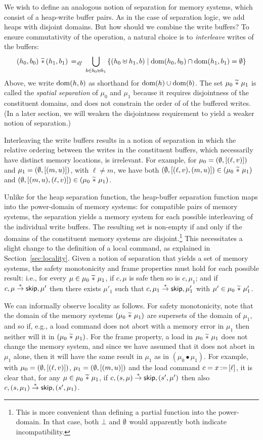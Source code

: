 \documentclass[11pt]{report}
\begin{document}
We wish to define an analogous notion of separation for memory systems, which consist of a heap-write buffer pairs. As in the case of separation logic, we add heaps with disjoint domains. But how should we combine the write buffers? To ensure commutativity of the operation, a natural choice is to \emph{interleave} writes of the buffers: \[ (h_0,b_0) \operatorname{\,\widetilde{\ast}\,} (h_1,b_1) \operatorname{\;=_{\mathit{df}}\;} \bigcup_{b \in b_0 \uplus b_1}
    \left\lbrace (h_0 \uplus h_1, b) \mid \operatorname{\mathrm{dom}}(h_0,b_0) \cap \operatorname{\mathrm{dom}}(h_1,b_1) = \operatorname{\emptyset} \right\rbrace
\] Above, we write $\operatorname{\mathrm{dom}}(h,b)$ as shorthand for $\operatorname{\mathrm{dom}}(h) \cup \operatorname{\mathrm{dom}}(b)$. The set $\mu_0 \operatorname{\,\widetilde{\ast}\,} \mu_1$ is called the \emph{spatial separation} of $\mu_0$ and $\mu_1$ because it requires disjointness of the constituent domains, and does not constrain the order of of the buffered writes. (In a later section, we will weaken the disjointness requirement to yield a weaker notion of separation.)

Interleaving the write buffers results in a notion of separation in which the relative ordering between the writes in the constituent buffers, which necessarily have distinct memory locations, is irrelevant. For example, for $\mu_0 = (\operatorname{\emptyset},\left[(\ell,v)\right])$ and $\mu_1 = (\operatorname{\emptyset},\left[(m,u)\right])$, with $\ell \neq m$, we have both $(\operatorname{\emptyset},\left[(\ell,v),(m,u)\right]) \in (\mu_0 \operatorname{\,\widetilde{\ast}\,} \mu_1)$ and $(\operatorname{\emptyset},\left[(m,u),(\ell,v)\right]) \in (\mu_0 \operatorname{\,\widetilde{\ast}\,} \mu_1)$. 

Unlike for the heap separation function, the heap-buffer separation function maps into the power-domain of memory systems: for compatible pairs of memory systems, the separation yields a memory system for each possible interleaving of the individual write buffers. The resulting set is non-empty if and only if the domains of the constituent memory systems are disjoint.\footnote{This is more convenient than defining a partial function into the power-domain. In that case, both $\bot$ and $\operatorname{\emptyset}$ would apparently both indicate incompatibility.} This necessitates a slight change to the definition of a local command, as explained in Section~\ref{sec:locality}. Given a notion of separation that yields a set of memory systems, the safety monotonicity and frame properties must hold for each possible result: i.e., for every $\mu \in \mu_0 \operatorname{\,\widetilde{\ast}\,} \mu_1$, if $c,\mu$ is safe then so is $c,\mu_1$; and if $c,\mu \stackrel{\ast}{\rightarrow} \operatorname{\mathsf{skip}},\mu'$ then there exists $\mu'_1$ such that $c,\mu_1 \stackrel{\ast}{\rightarrow} \operatorname{\mathsf{skip}},\mu'_1$ with $\mu' \in \mu_0 \operatorname{\,\widetilde{\ast}\,} \mu'_1$. 

We can informally observe locality as follows. For safety monotonicity, note that the domain of the memory systems $(\mu_0 \operatorname{\,\widetilde{\ast}\,} \mu_1)$ are supersets of the domain of $\mu_1$, and so if, e.g., a load command does not abort with a memory error in $\mu_1$ then neither will it in $(\mu_0 \operatorname{\,\widetilde{\ast}\,} \mu_1)$. For the frame property, a load in $\mu_0 \operatorname{\,\widetilde{\ast}\,} \mu_1$ does not change the memory system, and since we have assumed that it does not abort in $\mu_1$ alone, then it will have the same result in $\mu_1$ as in $(\mu_0 \bullet \mu_1)$. For example, with $\mu_0 = (\operatorname{\emptyset},\left[(\ell,v)\right])$, $\mu_1 = (\operatorname{\emptyset},\left[(m,u)\right])$ and the load command $c = x \operatorname{:\!=} \left[ \ell \right]$, it is clear that, for any $\mu \in \mu_0 \operatorname{\,\widetilde{\ast}\,} \mu_1$, if $c,(s,\mu) \stackrel{\ast}{\rightarrow} \operatorname{\mathsf{skip}},(s',\mu')$ then also $c,(s,\mu_1) \stackrel{\ast}{\rightarrow} \operatorname{\mathsf{skip}},(s',\mu_1)$.
\end{document}
